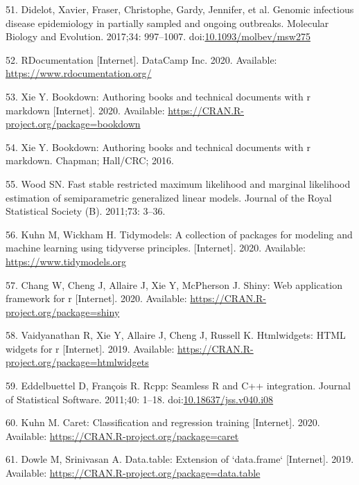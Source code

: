 \documentclass[10pt,letterpaper]{article}
\begin{document}
\leavevmode\hypertarget{ref-TransPhylo}{}%
51. Didelot, Xavier, Fraser, Christophe, Gardy, Jennifer, et al. Genomic
infectious disease epidemiology in partially sampled and ongoing
outbreaks. Molecular Biology and Evolution. 2017;34: 997--1007.
doi:\href{https://doi.org/10.1093/molbev/msw275}{10.1093/molbev/msw275}

\leavevmode\hypertarget{ref-rdocumentation}{}%
52. RDocumentation {[}Internet{]}. DataCamp Inc. 2020. Available:
\url{https://www.rdocumentation.org/}

\leavevmode\hypertarget{ref-bookdown}{}%
53. Xie Y. Bookdown: Authoring books and technical documents with r
markdown {[}Internet{]}. 2020. Available:
\url{https://CRAN.R-project.org/package=bookdown}

\leavevmode\hypertarget{ref-xie2016}{}%
54. Xie Y. Bookdown: Authoring books and technical documents with r
markdown. Chapman; Hall/CRC; 2016.

\leavevmode\hypertarget{ref-mgcv}{}%
55. Wood SN. Fast stable restricted maximum likelihood and marginal
likelihood estimation of semiparametric generalized linear models.
Journal of the Royal Statistical Society (B). 2011;73: 3--36.

\leavevmode\hypertarget{ref-tidymodels}{}%
56. Kuhn M, Wickham H. Tidymodels: A collection of packages for modeling
and machine learning using tidyverse principles. {[}Internet{]}. 2020.
Available: \url{https://www.tidymodels.org}

\leavevmode\hypertarget{ref-shiny}{}%
57. Chang W, Cheng J, Allaire J, Xie Y, McPherson J. Shiny: Web
application framework for r {[}Internet{]}. 2020. Available:
\url{https://CRAN.R-project.org/package=shiny}

\leavevmode\hypertarget{ref-htmlwidgets}{}%
58. Vaidyanathan R, Xie Y, Allaire J, Cheng J, Russell K. Htmlwidgets:
HTML widgets for r {[}Internet{]}. 2019. Available:
\url{https://CRAN.R-project.org/package=htmlwidgets}

\leavevmode\hypertarget{ref-Rcpp}{}%
59. Eddelbuettel D, François R. Rcpp: Seamless R and C++ integration.
Journal of Statistical Software. 2011;40: 1--18.
doi:\href{https://doi.org/10.18637/jss.v040.i08}{10.18637/jss.v040.i08}

\leavevmode\hypertarget{ref-caret}{}%
60. Kuhn M. Caret: Classification and regression training
{[}Internet{]}. 2020. Available:
\url{https://CRAN.R-project.org/package=caret}

\leavevmode\hypertarget{ref-datatable}{}%
61. Dowle M, Srinivasan A. Data.table: Extension of `data.frame`
{[}Internet{]}. 2019. Available:
\url{https://CRAN.R-project.org/package=data.table}
\end{document}

